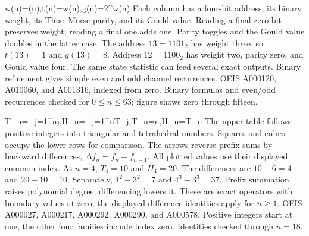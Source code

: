{w(n)=(n),\quad t(n)=w(n),\quad g(n)=2^{w(n)}}
{Each column has a four-bit address, its binary weight, its Thue--Morse parity, and its Gould value. Reading a final zero bit preserves weight; reading a final one adds one. Parity toggles and the Gould value doubles in the latter case.}
{The address $13=1101_2$ has weight three, so $t(13)=1$ and $g(13)=8$. Address $12=1100_2$ has weight two, parity zero, and Gould value four.}
{The same state statistic can feed several exact outputs. Binary refinement gives simple even and odd channel recurrences.}
{OEIS A000120, A010060, and A001316, indexed from zero. Binary formulas and even/odd recurrences checked for $0\le n\le63$; figure shows zero through fifteen.}

{T_n=\sum_{j=1}^{n}j,\quad H_n=\sum_{j=1}^{n}T_j,\quad \Delta T_n=n,\quad \Delta H_n=T_n}
{The upper table follows positive integers into triangular and tetrahedral numbers. Squares and cubes occupy the lower rows for comparison. The arrows reverse prefix sums by backward differences, $\Delta f_n=f_n-f_{n-1}$. All plotted values use their displayed common index.}
{At $n=4$, $T_4=10$ and $H_4=20$. The differences are $10-6=4$ and $20-10=10$. Separately, $4^2-3^2=7$ and $4^3-3^3=37$.}
{Prefix summation raises polynomial degree; differencing lowers it. These are exact operators with boundary values at zero; the displayed difference identities apply for $n\ge1$.}
{OEIS A000027, A000217, A000292, A000290, and A000578. Positive integers start at one; the other four families include index zero. Identities checked through $n=18$.}
